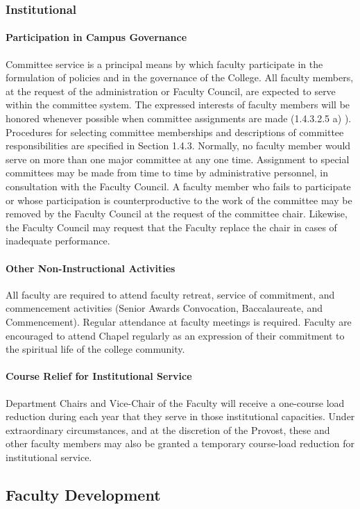 \documentclass[letterpaper, 11pt]{article}
\begin{document}
		\subsubsection{Institutional}
			\paragraph{Participation in Campus Governance}
				Committee service is a principal means by which faculty participate in the formulation of policies and in the governance of the College.  All faculty members, at the request of the administration or Faculty Council, are expected to serve within the committee system.  The expressed interests of faculty members will be honored whenever possible when committee assignments are made (1.4.3.2.5 a) ).  Procedures for selecting committee memberships and descriptions of committee responsibilities are specified in Section 1.4.3.  Normally, no faculty member would serve on more than one major committee at any one time.  Assignment to special committees may be made from time to time by administrative personnel, in consultation with the Faculty Council.  A faculty member who fails to participate or whose participation is counterproductive to the work of the committee may be removed by the Faculty Council at the request of the committee chair.  Likewise, the Faculty Council may request that the Faculty replace the chair in cases of inadequate performance.
			\paragraph{Other Non-Instructional Activities}
				All faculty are required to attend faculty retreat, service of commitment, and commencement activities (Senior Awards Convocation, Baccalaureate, and Commencement).  Regular attendance at faculty meetings is required.  Faculty are encouraged to attend Chapel regularly as an expression of their commitment to the spiritual life of the college community.
			\paragraph{Course Relief for Institutional Service}
				Department Chairs and Vice-Chair of the Faculty will receive a one-course load reduction during each year that they serve in those institutional capacities.  Under extraordinary circumstances, and at the discretion of the Provost, these and other faculty members may also be granted a temporary course-load reduction for institutional service.
	\subsection{Faculty Development}
\end{document}
